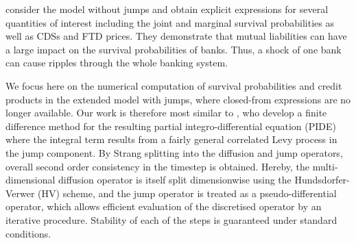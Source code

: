 %

\cite{LiptonItkin2015} consider the model without jumps and obtain explicit expressions for several quantities of interest including the joint and marginal survival probabilities as well as CDSs and FTD prices.
They demonstrate that mutual liabilities can have a large impact on the survival probabilities of banks. Thus, a shock of one bank can cause ripples through the whole banking system. 

We focus here on the numerical computation of survival probabilities and credit products in the extended model with jumps, where closed-from expressions are no longer available.
Our work is therefore most similar to \cite{LiptonItkin2014}, who 
develop a finite difference method for the resulting partial integro-differential equation (PIDE) where the integral term results from a fairly general correlated Levy process in the jump component. %
By Strang splitting into the diffusion and jump operators, overall second order consistency in the timestep is obtained.
Hereby, the multi-dimensional diffusion operator is itself split dimensionwise using the Hundsdorfer-Verwer (HV) scheme, and the jump operator is 
treated as a pseudo-differential operator, which allows efficient evaluation of the discretised operator by an iterative procedure.
Stability of each of the steps is guaranteed under standard conditions.

